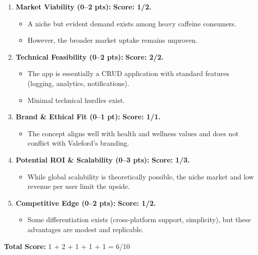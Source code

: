 \documentclass[11pt]{article}
\begin{document}
\begin{enumerate}[leftmargin=*, label=\textbf{\arabic*.}]
    \item \textbf{Market Viability (0--2 pts):} \textbf{Score: 1/2.} 
    \begin{itemize}[noitemsep]
        \item A niche but evident demand exists among heavy caffeine consumers. 
        \item However, the broader market uptake remains unproven.
    \end{itemize}
    
    \item \textbf{Technical Feasibility (0--2 pts):} \textbf{Score: 2/2.}
    \begin{itemize}[noitemsep]
        \item The app is essentially a CRUD application with standard features (logging, analytics, notifications).
        \item Minimal technical hurdles exist.
    \end{itemize}
    
    \item \textbf{Brand \& Ethical Fit (0--1 pt):} \textbf{Score: 1/1.}
    \begin{itemize}[noitemsep]
        \item The concept aligns well with health and wellness values and does not conflict with Valeford’s branding.
    \end{itemize}
    
    \item \textbf{Potential ROI \& Scalability (0--3 pts):} \textbf{Score: 1/3.}
    \begin{itemize}[noitemsep]
        \item While global scalability is theoretically possible, the niche market and low revenue per user limit the upside.
    \end{itemize}
    
    \item \textbf{Competitive Edge (0--2 pts):} \textbf{Score: 1/2.}
    \begin{itemize}[noitemsep]
        \item Some differentiation exists (cross-platform support, simplicity), but these advantages are modest and replicable.
    \end{itemize}
\end{enumerate}

\bigskip
\textbf{Total Score:} 1 + 2 + 1 + 1 + 1 = 6/10
\end{document}
